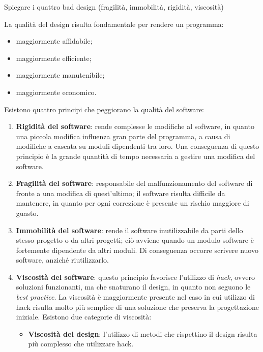 \begin{problem}{1.10}
Spiegare i quattro bad design (fragilità, immobilità, rigidità, viscosità)
\end{problem}
\begin{solution}
La qualità del design risulta fondamentale per rendere un programma:
\begin{itemize}
	\item maggiormente affidabile;
	\item maggiormente efficiente;
	\item maggiormente manutenibile;
	\item maggiormente economico.
\end{itemize}
Esistono quattro principi che peggiorano la qualità del software:
\begin{enumerate}
	\item \textbf{Rigidità del software}: rende complesse le modifiche al software, in quanto una piccola modifica influenza gran parte del programma, a causa di modifiche a cascata su moduli dipendenti tra loro.
	\newline Una conseguenza di questo principio è la grande quantità di tempo necessaria a gestire una modifica del software.
	\item \textbf{Fragilità del software}: responsabile del malfunzionamento del software di fronte a una modifica di quest'ultimo; il software risulta difficile da mantenere, in quanto per ogni correzione è presente un rischio maggiore di guasto.
	\item \textbf{Immobilità del software}: rende il software inutilizzabile da parti dello stesso progetto o da altri progetti; ciò avviene quando un modulo software è fortemente dipendente da altri moduli.
	\newline Di conseguenza occorre scrivere nuovo software, anziché riutilizzarlo.
	\item \textbf{Viscosità del software}: questo principio favorisce l'utilizzo di \textit{hack}, ovvero soluzioni funzionanti, ma che snaturano il design, in quanto non seguono le \textit{best practice}.
	\newline
	La viscosità è maggiormente presente nel caso in cui utilizzo di hack risulta molto più semplice di una soluzione che preserva la progettazione iniziale.
	\newline
	Esistono due categorie di viscosità:
	\begin{itemize}
		\item \textbf{Viscosità del design}: l'utilizzo di metodi che rispettino il design risulta più complesso che utilizzare hack.

\end{itemize}
\end{enumerate}
\end{solution}
